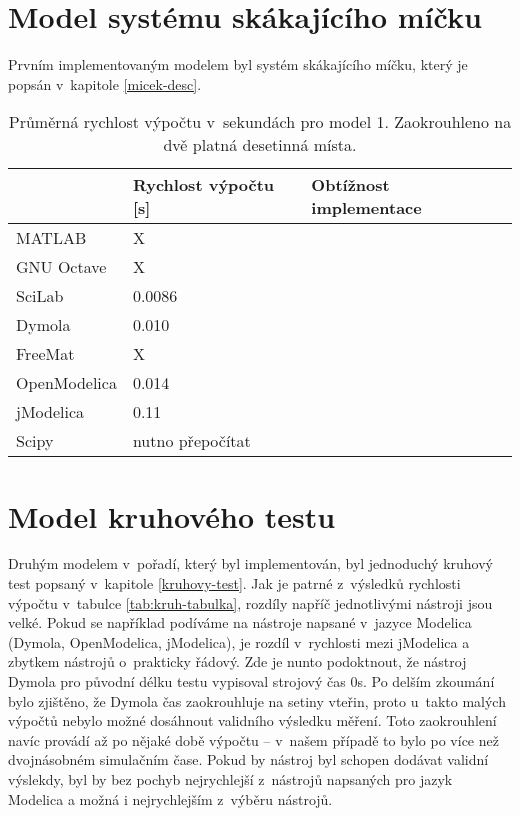 \section{Model systému skákajícího míčku}
\label{srovnani-micek}
Prvním implementovaným modelem byl systém skákajícího míčku, který je popsán v~kapitole \ref{micek-desc}.


\begin{table}[ht]
\centering
\begin{tabular}{|l|l|l|}
\hline
             & Rychlost výpočtu {[}s{]} & Obtížnost implementace \\ \hline
MATLAB       &              X            &  \\ \hline
GNU Octave   &             X             &  \\ \hline
SciLab       &          0.0086             &  \\ \hline
Dymola       &         0.010                 &  \\ \hline
FreeMat &                X          &  \\ \hline
OpenModelica    &       0.014                   &  \\ \hline
jModelica        &     0.11                     &  \\ \hline
Scipy           &          nutno přepočítat                &  \\ \hline
\end{tabular}
\caption{Průměrná rychlost výpočtu v~sekundách pro model 1. Zaokrouhleno na dvě platná desetinná místa.}
\label{tab:micek-tabulka}
\end{table}



\section{Model kruhového testu}
\label{srovnani-kruh}
Druhým modelem v~pořadí, který byl implementován, byl jednoduchý kruhový test popsaný v~kapitole \ref{kruhovy-test}. Jak je patrné z~výsledků rychlosti výpočtu v~tabulce \ref{tab:kruh-tabulka}, rozdíly napříč jednotlivými nástroji jsou velké. Pokud se například podíváme na nástroje napsané v~jazyce Modelica (Dymola, OpenModelica, jModelica), je rozdíl v~rychlosti mezi jModelica a zbytkem nástrojů o~prakticky řádový. Zde je nunto podoktnout, že nástroj Dymola pro původní délku testu vypisoval strojový čas 0s. Po delším zkoumání bylo zjištěno, že Dymola čas zaokrouhluje na setiny vteřin, proto u~takto malých výpočtů nebylo možné dosáhnout validního  výsledku měření. Toto zaokrouhlení navíc provádí až po nějaké době výpočtu -- v~našem případě to bylo po více než dvojnásobném simulačním čase. Pokud by nástroj byl schopen dodávat validní výslekdy, byl by bez pochyb nejrychlejší z~nástrojů napsaných pro jazyk Modelica a možná i nejrychlejším z~výběru nástrojů.


